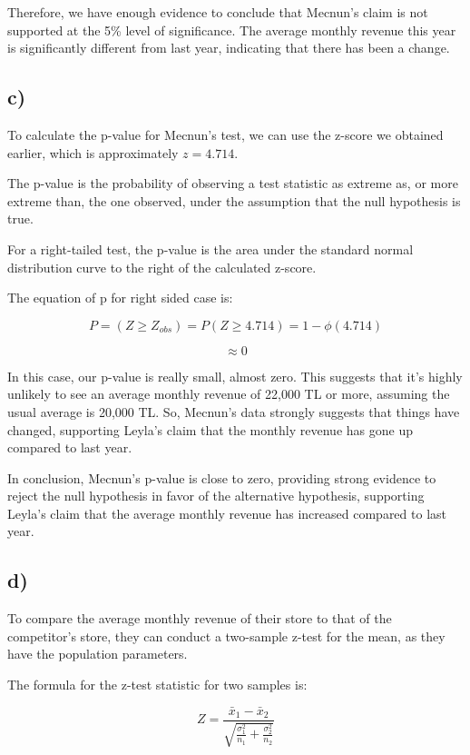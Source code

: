 \documentclass[12pt]{article}
\begin{document}
Therefore, we have enough evidence to conclude that Mecnun's claim is not supported at the 5\% level of significance. The average monthly revenue this year is significantly different from last year, indicating that there has been a change.

\subsection*{c)} 

To calculate the p-value for Mecnun's test, we can use the z-score we obtained earlier, which is approximately \(z = 4.714\).

The p-value is the probability of observing a test statistic as extreme as, or more extreme than, the one observed, under the assumption that the null hypothesis is true.

For a right-tailed test, the p-value is the area under the standard normal distribution curve to the right of the calculated z-score.

The equation of p for right sided case is:

\[P =(Z \geq Z_{obs}) = P(Z \geq 4.714) = 1 - \phi(4.714)\]

\[\approx 0\]


In this case, our p-value is really small, almost zero. This suggests that it's highly unlikely to see an average monthly revenue of 
22,000 TL or more, assuming the usual average is 20,000 TL. So, Mecnun's data strongly suggests that things have changed, supporting Leyla's claim that the monthly revenue has gone up compared to last year.

In conclusion, Mecnun's p-value is close to zero, providing strong evidence to reject the null hypothesis in favor of the alternative hypothesis, supporting Leyla's claim that the average monthly revenue has increased compared to last year.

\subsection*{d)} 

To compare the average monthly revenue of their store to that of the competitor's store, they can conduct a two-sample z-test for the mean, as they have the population parameters. 

The formula for the z-test statistic for two samples is:

\[ Z = \frac{\bar{x}_1 - \bar{x}_2}{\sqrt{\frac{\sigma_1^2}{n_1} + \frac{\sigma_2^2}{n_2}}} \]
\end{document}
